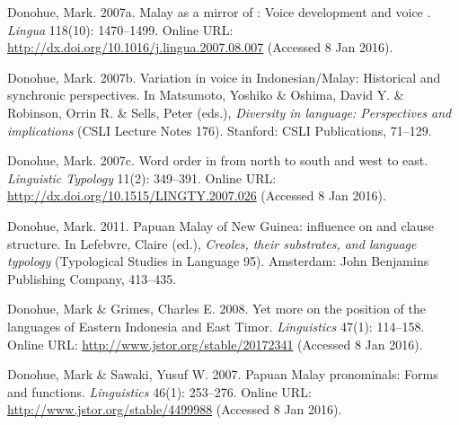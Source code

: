 \begin{styleCitaviBibliographyEntry}
Donohue, Mark. 2007a. Malay as a mirror of : Voice development and voice . \textit{Lingua} 118(10): 1470–1499. Online URL: \url{http://dx.doi.org/10.1016/j.lingua.2007.08.007} (Accessed 8 Jan 2016).
\end{styleCitaviBibliographyEntry}

\begin{styleCitaviBibliographyEntry}
Donohue, Mark. 2007b. Variation in voice in Indonesian/Malay: Historical and synchronic perspectives. In Matsumoto, Yoshiko \& Oshima, David Y. \& Robinson, Orrin R. \& Sells, Peter (eds.), \textit{Diversity in language: Perspectives and implications} (CSLI Lecture Notes 176). Stanford: CSLI Publications, 71–129.
\end{styleCitaviBibliographyEntry}

\begin{styleCitaviBibliographyEntry}
Donohue, Mark. 2007c. Word order in  from north to south and west to east. \textit{Linguistic Typology} 11(2): 349–391. Online URL: \url{http://dx.doi.org/10.1515/LINGTY.2007.026} (Accessed 8 Jan 2016).
\end{styleCitaviBibliographyEntry}

\begin{styleCitaviBibliographyEntry}
Donohue, Mark. 2011. Papuan Malay of New Guinea:  influence on  and clause structure. In Lefebvre, Claire (ed.), \textit{Creoles, their substrates, and language typology} (Typological Studies in Language 95). Amsterdam: John Benjamins Publishing Company, 413–435.
\end{styleCitaviBibliographyEntry}

\begin{styleCitaviBibliographyEntry}
Donohue, Mark \& Grimes, Charles E. 2008. Yet more on the position of the languages of Eastern Indonesia and East Timor. \textit{ Linguistics} 47(1): 114–158. Online URL: \url{http://www.jstor.org/stable/20172341} (Accessed 8 Jan 2016).
\end{styleCitaviBibliographyEntry}

\begin{styleCitaviBibliographyEntry}
Donohue, Mark \& Sawaki, Yusuf W. 2007. Papuan Malay pronominals: Forms and functions. \textit{ Linguistics} 46(1): 253–276. Online URL: \url{http://www.jstor.org/stable/4499988} (Accessed 8 Jan 2016).
\end{styleCitaviBibliographyEntry}

